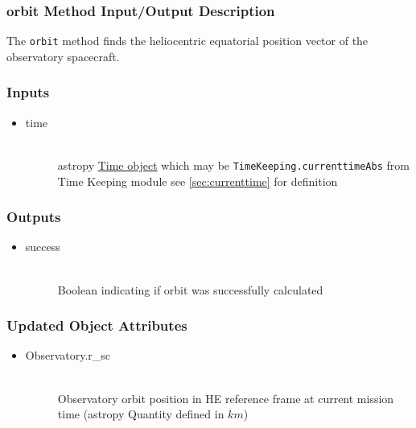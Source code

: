 \documentclass[cleanfoot]{asme2ej}
\begin{document}
\subsubsection{orbit Method Input/Output Description} \label{sec:orbittask}
The \verb+orbit+ method finds the heliocentric equatorial position vector of the observatory spacecraft.

\subsubsection*{Inputs}
\begin{itemize}
    \item
    \begin{description}
        \item[time] \hfill \\
        astropy \href{http://astropy.readthedocs.org/en/latest/time/index.html}{Time object} which may be \verb+TimeKeeping.currenttimeAbs+ from Time Keeping module see \ref{sec:currenttime} for definition
    \end{description}
\end{itemize}

\subsubsection*{Outputs}
\begin{itemize}
    \item
    \begin{description}
        \item[success] \hfill \\
        Boolean indicating if orbit was successfully calculated
    \end{description}
\end{itemize}

\subsubsection*{Updated Object Attributes}
\begin{itemize}
    \item
    \begin{description}
        \item[Observatory.r\_sc] \hfill \\
        Observatory orbit position in HE reference frame at current mission time (astropy Quantity defined in $ km $)
    \end{description}
\end{itemize}
\end{document}
